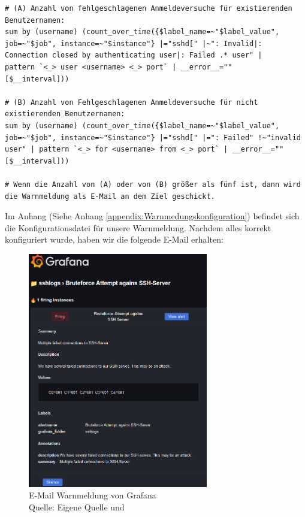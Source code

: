 {
\begin{Verbatim}[frame=single]
# (A) Anzahl von fehlgeschlagenen Anmeldeversuche für existierenden
Benutzernamen:
sum by (username) (count_over_time({$label_name=~"$label_value", 
job=~"$job", instance=~"$instance"} |="sshd[" |~": Invalid|: 
Connection closed by authenticating user|: Failed .* user" | 
pattern `<_> user <username> <_> port` | __error__="" 
[$__interval]))

# (B) Anzahl von Fehlgeschlagenen Anmeldeversuche für nicht 
existierenden Benutzernamen:
sum by (username) (count_over_time({$label_name=~"$label_value", 
job=~"$job", instance=~"$instance"} |="sshd[" |=": Failed" !~"invalid 
user" | pattern `<_> for <username> from <_> port` | __error__=""
[$__interval]))

# Wenn die Anzahl von (A) oder von (B) größer als fünf ist, dann wird
die Warnmeldung als E-Mail an dem Ziel geschickt.
\end{Verbatim}
}


Im Anhang (Siehe Anhang \ref{appendix:Warnmedungskonfiguration}) befindet sich die Konfigurationsdatei für unsere Warnmeldung. Nachdem alles korrekt konfiguriert wurde, haben wir die folgende E-Mail erhalten:

\begin{figure}[H]
   \centering
   \includegraphics[width=0.7\textwidth]{assets/GrafanaWarnmeldung.png}
   \caption[E-Mail Warnmeldung von Grafana]
   {E-Mail Warnmeldung von Grafana \\Quelle: Eigene Quelle und \citep{Grafana_alerting}}
   \centering
\end{figure}

